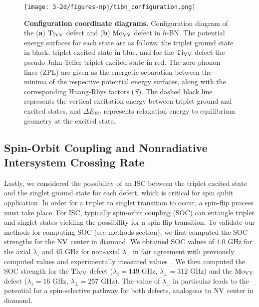 \begin{figure}[H]
    \centering
    \texttt{[image: 3-2d/figures-npj/tibn\_configuration.png]}
    \caption{
            \textbf{Configuration coordinate diagrams.}
    Configuration diagram of the (\textbf{a}) $\text{Ti}_{\text{V}\text{V}}$ defect and (\textbf{b}) $\text{Mo}_{\text{V}\text{V}}$ defect in $h$-BN. The potential energy surfaces for each state are as follows: the triplet ground state in black, triplet excited state in blue, and for the $\text{Ti}_{\text{V}\text{V}}$ defect the pseudo Jahn-Teller triplet excited state in red. The zero-phonon lines (ZPL) are given as the energetic separation between the minima of the respective potential energy surfaces, along with the corresponding Huang-Rhys factors ($S$). The dashed black line represents the vertical excitation energy between triplet ground and excited states, and $\Delta E_{FC}$ represents relaxation energy to equilibrium geometry at the excited state.
}
    \label{fig:config}
\end{figure}


\subsection{Spin-Orbit Coupling and Nonradiative Intersystem Crossing Rate}
Lastly, we considered the possibility of an ISC between the triplet excited state and the singlet ground state for each defect, which is critical for spin qubit application.
In order for a triplet to singlet transition to occur, a spin-flip process must take place. For ISC, typically spin-orbit coupling (SOC) can entangle triplet and singlet states yielding the possibility for a spin-flip transition. To validate our methods for computing SOC (see methods section), we first computed the SOC strengths for the $\text{NV}$ center in diamond. We obtained SOC values of 4.0 GHz for  the axial $\lambda_z$ and 45 GHz for non-axial  $\lambda_\perp$ in fair agreement with previously computed values and experimentally measured values~\cite{thiering2017ab,bassett2014ultrafast}.
We then computed the SOC strength for the $\text{Ti}_{\text{V}\text{V}}$ defect ($\lambda_z = 149$ GHz, $\lambda_\perp = 312$ GHz) and the $\text{Mo}_{\text{V}\text{V}}$ defect ($\lambda_z = 16$ GHz, $\lambda_\perp = 257$ GHz).
The value of $\lambda_\perp$ in particular leads to the potential for a spin-selective pathway for both defects, analogous to $\text{NV}$ center in diamond.

